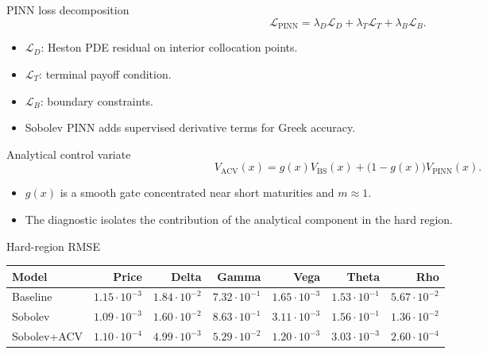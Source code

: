 \begin{frame}{PINN loss decomposition}
  \[
    \mathcal{L}_{\mathrm{PINN}}
    =
    \lambda_D\mathcal{L}_{D}
    +
    \lambda_T\mathcal{L}_{T}
    +
    \lambda_B\mathcal{L}_{B}.
  \]

  \begin{itemize}
    \item \(\mathcal{L}_D\): Heston PDE residual on interior collocation points.
    \item \(\mathcal{L}_T\): terminal payoff condition.
    \item \(\mathcal{L}_B\): boundary constraints.
    \item Sobolev PINN adds supervised derivative terms for Greek accuracy.
  \end{itemize}
\end{frame}

\begin{frame}{Analytical control variate}
  \[
    V_{\mathrm{ACV}}(x)
    =
    g(x)V_{\mathrm{BS}}(x)
    +
    \bigl(1-g(x)\bigr)V_{\mathrm{PINN}}(x).
  \]

  \begin{itemize}
    \item \(g(x)\) is a smooth gate concentrated near short maturities and \(m\approx1\).
    \item The diagnostic isolates the contribution of the analytical component in the hard region.
  \end{itemize}
\end{frame}

\begin{frame}{Hard-region RMSE}
  \centering
  \scriptsize
  \begin{tabular}{lrrrrrr}
    \toprule
    Model & Price & Delta & Gamma & Vega & Theta & Rho \\
    \midrule
    Baseline & \(1.15\cdot10^{-3}\) & \(1.84\cdot10^{-2}\) & \(7.32\cdot10^{-1}\) & \(1.65\cdot10^{-3}\) & \(1.53\cdot10^{-1}\) & \(5.67\cdot10^{-2}\) \\
    Sobolev & \(1.09\cdot10^{-3}\) & \(1.60\cdot10^{-2}\) & \(8.63\cdot10^{-1}\) & \(3.11\cdot10^{-3}\) & \(1.56\cdot10^{-1}\) & \(1.36\cdot10^{-2}\) \\
    Sobolev+ACV & \(1.10\cdot10^{-4}\) & \(4.99\cdot10^{-3}\) & \(5.29\cdot10^{-2}\) & \(1.20\cdot10^{-3}\) & \(3.03\cdot10^{-3}\) & \(2.60\cdot10^{-4}\) \\
    \bottomrule
  \end{tabular}
\end{frame}

